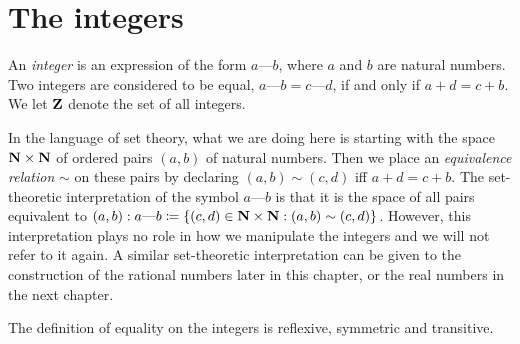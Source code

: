 \section{The integers}\label{sec 4.1}

\begin{definition}[Integers]\label{4.1.1}
  An \emph{integer} is an expression of the form \(a \text{---} b\), where \(a\) and \(b\) are natural numbers.
  Two integers are considered to be equal, \(a \text{---} b = c \text{---} d\), if and only if \(a + d = c + b\).
  We let \(\mathbf{Z}\) denote the set of all integers.
\end{definition}

\begin{note}
  In the language of set theory, what we are doing here is starting with the space \(\mathbf{N} \times \mathbf{N}\) of ordered pairs \((a, b)\) of natural numbers.
  Then we place an \emph{equivalence relation} \(\sim\) on these pairs by declaring \((a, b) \sim (c, d)\) iff \(a + d = c + b\).
  The set-theoretic interpretation of the symbol \(a \text{---} b\) is that it is the space of all pairs equivalent to \((a, b): a \text{---} b \coloneqq \{(c, d) \in \mathbf{N} \times \mathbf{N} : (a, b) \sim (c, d)\}\).
  However, this interpretation plays no role in how we manipulate the integers and we will not refer to it again.
  A similar set-theoretic interpretation can be given to the construction of the rational numbers later in this chapter, or the real numbers in the next chapter.
\end{note}

\begin{additional corollary}\label{ac 4.1.1}
The definition of equality on the integers is reflexive, symmetric and transitive.
\end{additional corollary}


